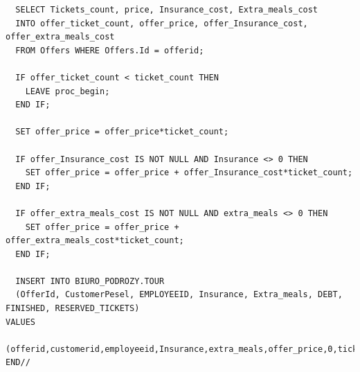\documentclass[polish,polish,a4paper]{article}
\begin{document}
\begin{lstlisting}
  SELECT Tickets_count, price, Insurance_cost, Extra_meals_cost
  INTO offer_ticket_count, offer_price, offer_Insurance_cost, offer_extra_meals_cost
  FROM Offers WHERE Offers.Id = offerid;
  
  IF offer_ticket_count < ticket_count THEN
    LEAVE proc_begin;
  END IF;
  
  SET offer_price = offer_price*ticket_count;
  
  IF offer_Insurance_cost IS NOT NULL AND Insurance <> 0 THEN
    SET offer_price = offer_price + offer_Insurance_cost*ticket_count;
  END IF;
  
  IF offer_extra_meals_cost IS NOT NULL AND extra_meals <> 0 THEN
    SET offer_price = offer_price + offer_extra_meals_cost*ticket_count;
  END IF;
  
  INSERT INTO BIURO_PODROZY.TOUR 
  (OfferId, CustomerPesel, EMPLOYEEID, Insurance, Extra_meals, DEBT, FINISHED, RESERVED_TICKETS) 
VALUES 
  (offerid,customerid,employeeid,Insurance,extra_meals,offer_price,0,ticket_count);
END//
\end{lstlisting}
\end{document}
